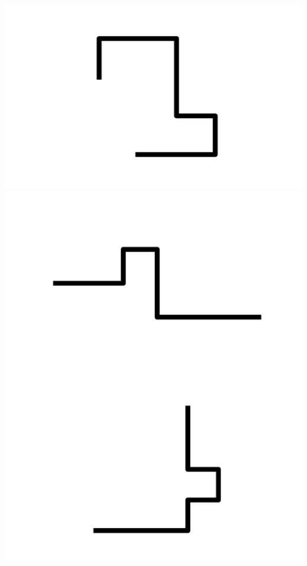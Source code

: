 \documentclass[]{report}
\begin{document}
\includegraphics[scale=.1]{pictures/21/state_cluster_shapes_163.pdf} 
\includegraphics[scale=.1]{pictures/21/state_cluster_shapes_164.pdf} 
\includegraphics[scale=.1]{pictures/21/state_cluster_shapes_165.pdf} 
\end{document}
